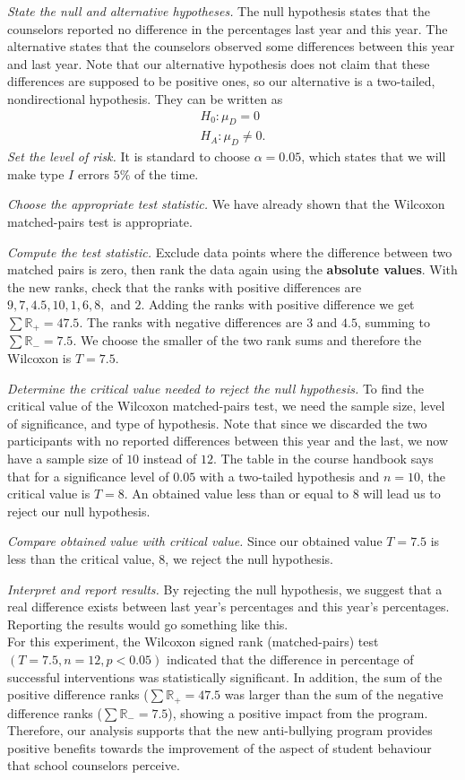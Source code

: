 \textit{State the null and alternative hypotheses.} The null hypothesis states that the counselors reported no difference in the percentages last year and this year. The alternative states that the counselors observed some differences between this year and last year. Note that our alternative hypothesis does not claim that these differences are supposed to be positive ones, so our alternative is a two-tailed, nondirectional hypothesis. They can be written as
\begin{align*}
    H_0:\mu_D = 0 \\
    H_A:\mu_D \neq 0.
\end{align*}
\textit{Set the level of risk.} It is standard to choose $\alpha = 0.05$, which states that we will make type $I$ errors $5\%$ of the time.

\textit{Choose the appropriate test statistic.} We have already shown that the Wilcoxon matched-pairs test is appropriate.

\textit{Compute the test statistic.} Exclude data points where the difference between two matched pairs is zero, then rank the data again using the \textbf{absolute values}. With the new ranks, check that the ranks with positive differences are $9,7,4.5,10,1,6,8,$ and $2$. Adding the ranks with positive difference we get $\sum\mathds{R}_{+} = 47.5$. The ranks with negative differences are $3$ and $4.5$, summing to $\sum\mathds{R}_{-} = 7.5$. We choose the smaller of the two rank sums and therefore the Wilcoxon is $T = 7.5$.

\textit{Determine the critical value needed to reject the null hypothesis.} To find the critical value of the Wilcoxon matched-pairs test, we need the sample size, level of significance, and type of hypothesis. Note that since we discarded the two participants with no reported differences between this year and the last, we now have a sample size of $10$ instead of $12$. The table in the course handbook says that for a significance level of $0.05$ with a two-tailed hypothesis and $n = 10$, the critical value is $T = 8$. An obtained value less than or equal to $8$ will lead us to reject our null hypothesis. 

\textit{Compare obtained value with critical value.} Since our obtained value $T = 7.5$ is less than the critical value, $8$, we reject the null hypothesis.

\textit{Interpret and report results.} By rejecting the null hypothesis, we suggest that a real difference exists between last year's percentages and this year's percentages. Reporting the results would go something like this. \\
For this experiment, the Wilcoxon signed rank (matched-pairs) test $(T = 7.5, n = 12, p < 0.05)$ indicated that the difference in percentage of successful interventions was statistically significant. In addition, the sum of the positive difference ranks ($\sum\mathds{R}_{+} = 47.5$ was larger than the sum of the negative difference ranks ($\sum\mathds{R}_{-} = 7.5$), showing a positive impact from the program. Therefore, our analysis supports that the new anti-bullying program provides positive benefits towards the improvement of the aspect of student behaviour that school counselors perceive.

